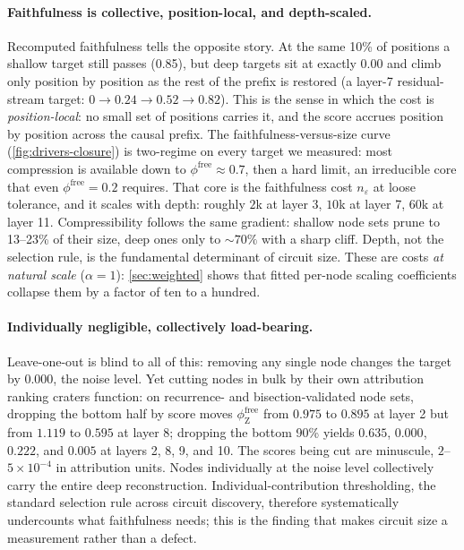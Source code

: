 \documentclass[10pt]{article}
\begin{document}
\paragraph{Faithfulness is collective, position-local, and depth-scaled.}
Recomputed faithfulness tells the opposite story.
At the same 10\% of positions a shallow target still passes (0.85), but deep targets sit at exactly 0.00 and climb only position by position as the rest of the prefix is restored (a layer-7 residual-stream target: $0 \rightarrow 0.24 \rightarrow 0.52 \rightarrow 0.82$).
This is the sense in which the cost is \emph{position-local}: no small set of positions carries it, and the score accrues position by position across the causal prefix.
The faithfulness-versus-size curve (\cref{fig:drivers-closure}) is two-regime on every target we measured: most compression is available down to $\phi^{\mathrm{free}} \approx 0.7$, then a hard limit, an irreducible core that even $\phi^{\mathrm{free}} = 0.2$ requires.
That core is the faithfulness cost $n_{\varepsilon}$ at loose tolerance, and it scales with depth: roughly $2$k at layer 3, $10$k at layer 7, $60$k at layer 11.
Compressibility follows the same gradient: shallow node sets prune to 13--23\% of their size, deep ones only to ${\sim}70\%$ with a sharp cliff.
Depth, not the selection rule, is the fundamental determinant of circuit size.
These are costs \emph{at natural scale} ($\alpha = 1$): \cref{sec:weighted} shows that fitted per-node scaling coefficients collapse them by a factor of ten to a hundred.

\paragraph{Individually negligible, collectively load-bearing.}
Leave-one-out is blind to all of this: removing any single node changes the target by $0.000$, the noise level.
Yet cutting nodes in bulk by their own attribution ranking craters function: on recurrence- and bisection-validated node sets, dropping the bottom half by score moves $\phi^{\mathrm{free}}_{\mathrm{Z}}$ from $0.975$ to $0.895$ at layer 2 but from $1.119$ to $0.595$ at layer 8; dropping the bottom 90\% yields $0.635$, $0.000$, $0.222$, and $0.005$ at layers 2, 8, 9, and 10.
The scores being cut are minuscule, $2$--$5 \times 10^{-4}$ in attribution units.
Nodes individually at the noise level collectively carry the entire deep reconstruction.
Individual-contribution thresholding, the standard selection rule across circuit discovery, therefore systematically undercounts what faithfulness needs; this is the finding that makes circuit size a measurement rather than a defect.
\end{document}
